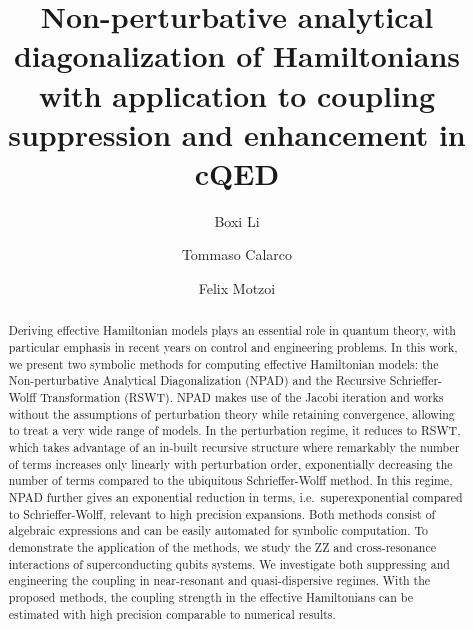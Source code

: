 \documentclass[%
 reprint,
 amsmath,amssymb,
 aps,
pra,
noeprint,
superscriptaddress,
]{revtex4-2}
\begin{document}
\title{Non-perturbative analytical diagonalization of Hamiltonians with application to coupling suppression and enhancement in cQED}%

\author{Boxi Li}
\author{Tommaso Calarco}
\author{Felix Motzoi}

\begin{abstract}
Deriving effective Hamiltonian models plays an essential role in quantum theory, with particular emphasis in recent years on control and engineering problems.
In this work, we present two symbolic methods for computing effective Hamiltonian models: the Non-perturbative Analytical Diagonalization (NPAD) and the Recursive Schrieffer-Wolff Transformation (RSWT). 
NPAD makes use of the Jacobi iteration and works without the assumptions of perturbation theory while retaining convergence, allowing to treat a very wide range of models.
In the perturbation regime, it reduces to RSWT, which takes advantage of an in-built recursive structure where remarkably the number of terms increases only linearly with perturbation order, exponentially decreasing the number of terms compared to the ubiquitous Schrieffer-Wolff method.
In this regime, NPAD further gives an exponential reduction in terms, i.e.~superexponential compared to Schrieffer-Wolff, relevant to high precision expansions.
Both methods consist of algebraic expressions and can be easily automated for symbolic computation.
To demonstrate the application of the methods, we study the ZZ and cross-resonance interactions of superconducting qubits systems.
We investigate both suppressing and engineering the coupling in near-resonant and quasi-dispersive regimes.
With the proposed methods, the coupling strength in the effective Hamiltonians can be estimated with high precision comparable to numerical results.

\end{abstract}

\maketitle
\end{document}
